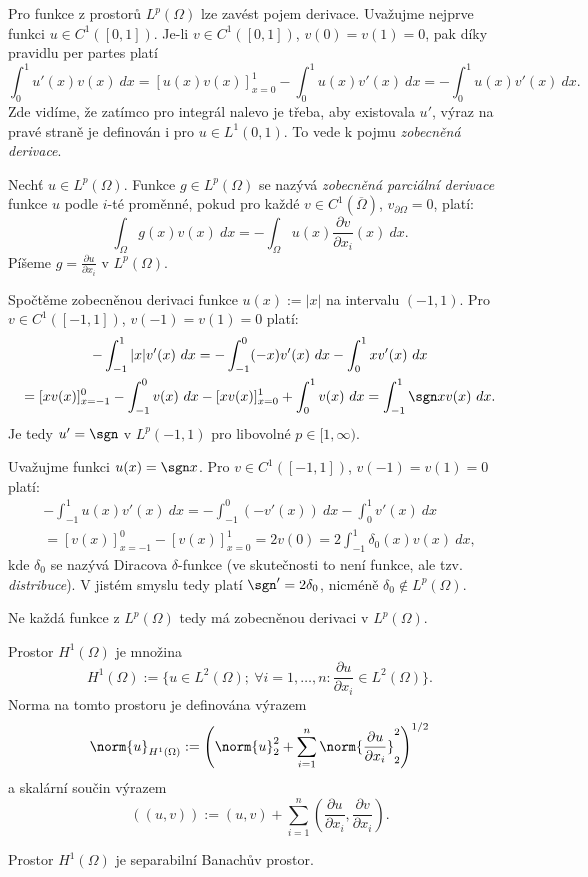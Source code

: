 Pro funkce z prostorů $L^p(\Omega)$ lze zavést pojem derivace.
Uvažujme nejprve funkci $u\in C^1([0,1])$.
Je-li $v\in C^1([0,1])$, $v(0)=v(1)=0$, pak díky pravidlu per partes platí
\[ \int_0^1 u'(x)v(x)~dx = [u(x)v(x)]_{x=0}^1 - \int_0^1u(x)v'(x)~dx = - \int_0^1u(x)v'(x)~dx. \]
Zde vidíme, že zatímco pro integrál nalevo je třeba, aby existovala $u'$, výraz na pravé straně je definován i pro $u\in L^1(0,1)$. To vede k pojmu \emph{zobecněná derivace}.
\begin{df}
Nechť $u\in L^p(\Omega)$. Funkce $g\in L^p(\Omega)$ se nazývá \emph{zobecněná parciální derivace} funkce $u$ podle $i$-té proměnné, pokud pro každé $v\in C^1(\overline\Omega)$, $v_{\partial\Omega}=0$, platí:
\[ \int_\Omega g(x)v(x)~dx = -\int_{\Omega} u(x)\frac{\partial v}{\partial x_i}(x)~dx. \]
Píšeme $g=\frac{\partial u}{\partial x_i}$ v $L^p(\Omega)$.
\end{df}
\begin{ex}
Spočtěme zobecněnou derivaci funkce $u(x):=|x|$ na intervalu $(-1,1)$.
Pro $v\in C^1([-1,1])$, $v(-1)=v(1)=0$ platí:
\begin{multline*}
-\int_{-1}^1|x|v'(x)~dx = -\int_{-1}^0(-x)v'(x)~dx - \int_0^1xv'(x)~dx\\
= [xv(x)]_{x=-1}^0 - \int_{-1}^0v(x)~dx - [xv(x)]_{x=0}^1 + \int_0^1v(x)~dx
= \int_{-1}^1\sgn x v(x)~dx.
\end{multline*}
Je tedy $u'=\sgn$ v $L^p(-1,1)$ pro libovolné $p\in[1,\infty)$.
\end{ex}
\begin{ex}
Uvažujme funkci $u(x) = \sgn x$. Pro $v\in C^1([-1,1])$, $v(-1)=v(1)=0$ platí:
\begin{multline*}
 -\int_{-1}^1u(x)v'(x)~dx = -\int_{-1}^0 (-v'(x))~dx - \int_0^1 v'(x)~dx\\
 = [v(x)]_{x=-1}^0 - [v(x)]_{x=0}^1 = 2v(0) = 2\int_{-1}^1\delta_0(x)v(x)~dx,
\end{multline*}
kde $\delta_0$ se nazývá Diracova $\delta$-funkce (ve skutečnosti to není funkce, ale tzv. \emph{distribuce}). V jistém smyslu tedy platí $\sgn'=2\delta_0$, nicméně $\delta_0\notin L^p(\Omega)$.
\end{ex}
Ne každá funkce z $L^p(\Omega)$ tedy má zobecněnou derivaci v $L^p(\Omega)$.
\begin{df}
Prostor $H^1(\Omega)$ je množina
\[ H^1(\Omega):=\{u\in L^2(\Omega);~\forall i=1,\ldots,n:\frac{\partial u}{\partial x_i}\in L^2(\Omega)\}. \]
Norma na tomto prostoru je definována výrazem
\[ \norm{u}_{H^1(\Omega)} := \left(\norm{u}_2^2 + \sum_{i=1}^n\norm{\frac{\partial u}{\partial x_i}}_2^2\right)^{1/2} \]
a skalární součin výrazem
\[ ((u,v)):=(u,v) + \sum_{i=1}^n(\frac{\partial u}{\partial x_i},\frac{\partial v}{\partial x_i}). \]
\end{df}
\begin{veta}
Prostor $H^1(\Omega)$ je separabilní Banachův prostor.
\end{veta}


